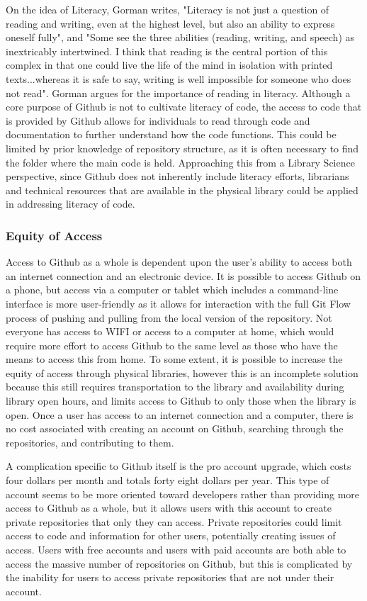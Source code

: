On the idea of Literacy, Gorman writes, "Literacy is not just a question of reading and writing, even at the highest level, but also an ability to express oneself fully", and "Some see the three abilities (reading, writing, and speech) as inextricably intertwined. I think that reading is the central portion of this complex in that one could live the life of the mind in isolation with printed texts...whereas it is safe to say, writing is well impossible for someone who does not read"\cite{gorman2000values}. Gorman argues for the importance of reading in literacy. Although a core purpose of Github is not to cultivate literacy of code, the access to code that is provided by Github allows for individuals to read through code and documentation to further understand how the code functions. This could be limited by prior knowledge of repository structure, as it is often necessary to find the folder where the main code is held. Approaching this from a Library Science perspective, since Github does not inherently include literacy efforts, librarians and technical resources that are available in the physical library could be applied in addressing literacy of code. 

\subsubsection{Equity of Access}
Access to Github as a whole is dependent upon the user's ability to access both an internet connection and an electronic device. It is possible to access Github on a phone, but access via a computer or tablet which includes a command-line interface is more user-friendly as it allows for interaction with the full Git Flow process of pushing and pulling from the local version of the repository. Not everyone has access to WIFI or access to a computer at home, which would require more effort to access Github to the same level as those who have the means to access this from home. To some extent, it is possible to increase the equity of access through physical libraries, however this is an incomplete solution because this still requires transportation to the library and availability during library open hours, and limits access to Github to only those when the library is open.  Once a user has access to an internet connection and a computer, there is no cost associated with creating an account on Github, searching through the repositories, and contributing to them. 

A complication specific to Github itself is the pro account upgrade, which costs four dollars per month and totals forty eight dollars per year. This type of account seems to be more oriented toward developers rather than providing more access to Github as a whole, but it allows users with this account to create private repositories that only they can access. Private repositories could limit access to code and information for other users, potentially creating issues of access. Users with free accounts and users with paid accounts are both able to access the massive number of repositories on Github, but this is complicated by the inability for users to access private repositories that are not under their account. 

